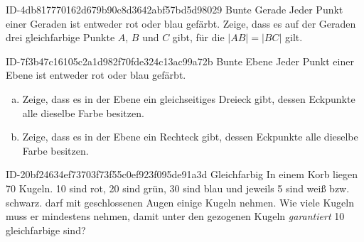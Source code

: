 \begin{exercise}
      {ID-4db817770162d679b90c8d3642abf57bd5d98029}
      {Bunte Gerade}
  \ifproblem\problem
    Jeder Punkt einer Geraden ist entweder rot oder blau gefärbt.
    Zeige, dass es auf der Geraden drei gleichfarbige Punkte $A$,
    $B$ und $C$ gibt, für die $|AB|=|BC|$ gilt.
  \fi
\end{exercise}

\begin{exercise}
      {ID-7f3b47c16105c2a1d982f70fde324c13ac99a72b}
      {Bunte Ebene}
  \ifproblem\problem
    Jeder Punkt einer Ebene ist entweder rot oder blau gefärbt.
    \begin{enumerate}[a)]
      \item Zeige, dass es in der Ebene ein gleichseitiges Dreieck gibt,
            dessen Eckpunkte alle dieselbe Farbe besitzen.
      \item Zeige, dass es in der Ebene ein Rechteck gibt,
            dessen Eckpunkte alle dieselbe Farbe besitzen.
    \end{enumerate}
  \fi
\end{exercise}

\begin{exercise}
      {ID-20bf24634ef73703f73f55c0ef923f095de91a3d}
      {Gleichfarbig}
  \ifproblem\problem
    In einem Korb liegen 70 Kugeln. 10 sind rot, 20 sind grün, 30 sind blau
    und jeweils 5 sind weiß bzw. schwarz. \xya{} darf mit geschlossenen Augen
    einige Kugeln nehmen. Wie viele Kugeln muss er mindestens nehmen, damit
    unter den gezogenen Kugeln \emph{garantiert} 10 gleichfarbige sind?
  \fi
\end{exercise}

%

